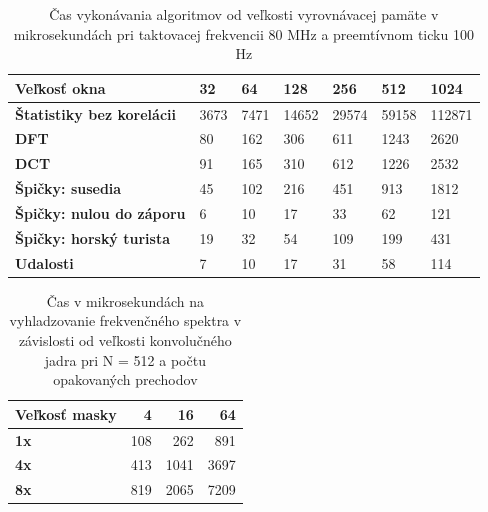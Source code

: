 \begin{table}[h]
\def\arraystretch{1.25}
\centering
\begin{tabular}{|l|l|l|l|l|l|l|}
\hline
\textbf{Veľkosť okna}         & \textbf{32} & \textbf{64} & \textbf{128} & \textbf{256} & \textbf{512} & \textbf{1024} \\ \hline
\textbf{Štatistiky bez korelácii}& 3673        & 7471        & 14652        & 29574        & 59158        & 112871        \\ \hline
\textbf{DFT}                     & 80          & 162         & 306          & 611          & 1243         & 2620          \\ \hline
\textbf{DCT}                     & 91          & 165         & 310          & 612          & 1226         & 2532          \\ \hline
\textbf{Špičky: susedia}         & 45          & 102         & 216          & 451          & 913          & 1812          \\ \hline
\textbf{Špičky: nulou do záporu} & 6           & 10          & 17           & 33           & 62           & 121           \\ \hline
\textbf{Špičky: horský turista}  & 19          & 32          & 54           & 109          & 199          & 431           \\ \hline
\textbf{Udalosti}                & 7           & 10          & 17           & 31           & 58           & 114           \\ \hline
\end{tabular}
\caption{Čas vykonávania algoritmov od veľkosti vyrovnávacej pamäte v mikrosekundách pri taktovacej frekvencii 80 MHz a preemtívnom
ticku 100 Hz}
\end{table}

\begin{table}[h]
\def\arraystretch{1.25}
\centering
\begin{tabular}{|l|r|r|r|}
\hline
\textbf{Veľkosť masky}  & \textbf{4} & \textbf{16} & \textbf{64} \\ \hline
\textbf{1x} & 108        & 262         & 891         \\ \hline
\textbf{4x} & 413        & 1041        & 3697        \\ \hline
\textbf{8x} & 819        & 2065        & 7209        \\ \hline
\end{tabular}
\caption{Čas v mikrosekundách na vyhladzovanie frekvenčného spektra v závislosti od veľkosti konvolučného jadra pri N = 512 a počtu opakovaných prechodov}
\end{table}


